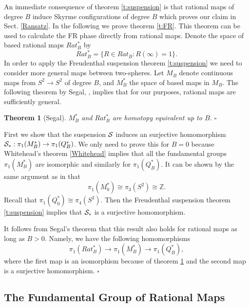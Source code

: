 \documentclass[a4paper,12pt]{article}
\newtheorem {theorem}{Theorem}[section]
\begin{document}
An immediate consequence of theorem \ref{t:suspension} is that rational
maps of degree $B$ induce Skyrme configurations of degree $B$ which proves our 
claim in Sect. \ref{Ransatz}. In the
following we prove theorem \ref{t:FR}. This theorem can be used to
calculate the FR phase directly from rational maps.
Denote the space of based rational maps $Rat_B^*$ by
%
\begin{equation}
Rat_B^* = \{R \in Rat_B: R(\infty) = 1 \}.
\end{equation}
%
In order to apply the Freudenthal suspension theorem \ref{t:suspension} we 
need to consider more general maps between two-spheres.
%
Let $M_B$ denote continuous maps from $S^2 \to S^2$ of degree 
$B$, and  $M_B^*$ the space of based maps in $M_B$. The following 
theorem by Segal, \cite{Segal:1979}, implies that for our purposes, rational 
maps are sufficiently general.
%
\begin{theorem}[Segal] 
\label{t:homotopyequiv}
$M_B^*$ and $Rat_B^*$ are homotopy equivalent up to $B$. \hfill $\square$
\end{theorem}


First we show that the suspension ${\cal S}$ induces an surjective homomorphism 
${\cal S}_*: \pi_1(M_B^*) \to \pi_1(Q_B^*)$.
We only need to prove this  
for $B=0$ because Whitehead's theorem \ref{Whitehead} implies that all the 
fundamental groups $\pi_1(M_B^*)$ are isomorphic and similarly for 
$\pi_1(Q_B^*)$. It can be shown by the same argument as in 
\cite{Finkelstein:1966ft} that 
%
\begin{equation}
\pi_1(M_0^*) \cong \pi_3(S^2) \cong {\mathbb Z}.
\end{equation}
%
Recall that $\pi_1(Q_0^*) \cong \pi_4(S^3)$. Then the Freudenthal
suspension theorem \ref{t:suspension} implies that ${\cal S}_*$ is a
surjective homomorphism. 

It follows from Segal's theorem that this result also 
holds for rational maps as long as $B>0$. Namely, we have the following 
homomorphisms
%
\begin{equation}
\label{epimorphism}
\pi_1(Rat_B^*) \to \pi_1(M_B^*) \to \pi_1(Q_B^*),
\end{equation}
%
where the first map is an isomorphism because of theorem 
\ref{t:homotopyequiv} and the second map is a surjective homomorphism. \hfill 
$\square$


\subsection{The Fundamental Group of Rational Maps}
\label{Fundamental}
\end{document}
